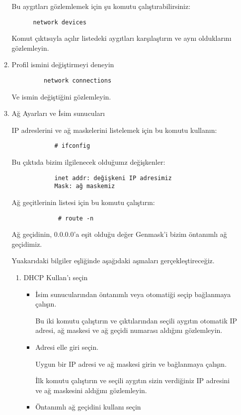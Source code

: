 \documentclass[a4paper,10pt]{article}
\begin{document}
\begin{enumerate}
\begin{enumerate}
	  Bu aygıtları gözlemlemek için şu komutu çalıştırabilirsiniz:
	  \begin{verbatim}
	  network devices
	  \end{verbatim}
	  Komut çıktısıyla açılır listedeki aygıtları karşılaştırın ve aynı olduklarını gözlemleyin.

	  \item Profil ismini değiştirmeyi deneyin
	    \begin{verbatim}
	     network connections
	    \end{verbatim}
	    Ve ismin değiştiğini gözlemleyin.
   
   	  \item Ağ Ayarları ve İsim sunucuları

	    IP adreslerini ve ağ maskelerini listelemek için bu komutu kullanın:
		  \begin{verbatim}
		    # ifconfig
		  \end{verbatim}
	   Bu çıktıda bizim ilgilenecek olduğumz değişkenler:
		   \begin{verbatim}
		    inet addr: değişkeni IP adresimiz
		    Mask: ağ maskemiz
		  \end{verbatim}
	   Ağ geçitlerinin listesi için bu komutu çalıştırın:
	    	   \begin{verbatim}
		     # route -n 
		  \end{verbatim}
	   Ağ geçidinin, 0.0.0.0'a eşit olduğu değer Genmask'i bizim öntanımlı ağ geçidimiz.

	Yuakarıdaki bilgiler eşliğinde aşağıdaki aşmaları gerçekleştireceğiz.
	      \begin{enumerate} 
	      \item DHCP Kullan'ı seçin
		\begin{itemize}
		  \item İsim sunucularından öntanımlı veya otomatiği seçip bağlanmaya çalışın.
				      
		   Bu iki komutu çalıştırın ve çıktılarından seçili aygıtın otomatik IP adresi, ağ maskesi ve ağ geçidi numarası aldığını gözlemleyin.

		  \item Adresi elle giri seçin.

		   Uygun bir IP adresi ve ağ maskesi girin ve bağlanmaya çalışın.
		
		   İlk komutu çalıştırın ve seçili aygıtın sizin verdiğiniz IP adresini ve ağ maskesini aldığını gözlemleyin.
  
		  \item Öntanımlı ağ geçidini kullanı seçin


\end{itemize}
\end{enumerate}
\end{enumerate}
\end{enumerate}
\end{document}
